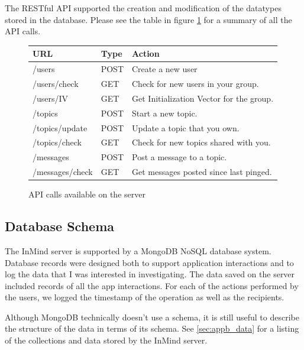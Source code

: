       The RESTful API supported the creation and modification of the datatypes
      stored in the database.
      Please see the table in figure \ref{fig:api_table} for a summary of all the API calls.

    \begin{figure}
    \centering
    \begin{tabular}{ | l | l | l |}
    \hline
    URL & Type & Action \\ \hline
    /users & POST & Create a new user \\[5pt] \hline
    /users/check & GET & Check for new users in your group. \\[5pt] \hline
    /users/IV & GET & Get Initialization Vector for the group. \\[5pt] \hline
    /topics & POST & Start a new topic. \\[5pt] \hline
    /topics/update & POST & Update a topic that you own. \\[5pt] \hline
    /topics/check & GET & Check for new topics shared with you. \\[5pt] \hline
    /messages & POST & Post a message to a topic. \\[5pt] \hline
    /messages/check & GET & Get messages posted since last pinged. \\[5pt]
    \hline
    \end{tabular}

    \caption{API calls available on the server}
    \label{fig:api_table}
    \end{figure}

    \subsection{Database Schema}
      The InMind server is supported by a MongoDB NoSQL database system.
      Database records were designed both to support application interactions
      and to log the data that I was interested in investigating.
      The data saved on the server included records of all the app interactions.
      For each of the actions performed by the users,
      we logged the timestamp of the operation as well as the recipients.

      Although MongoDB technically doesn't use a schema,
      it is still useful to describe the structure of the data in terms of its schema.
      See \ref{sec:appb_data} for a listing of the collections and data stored by
      the InMind server.

